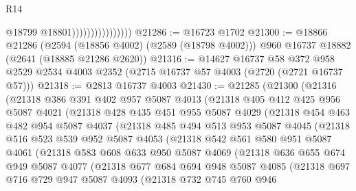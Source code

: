 \begin{lexlean}{R14}
\begin{coremodule}
                                    @18799
                                    @18801))))))))))))))))
@21286 := @16723 @1702
@21300 := @18866
    @21286
    (@2594 (@18856 @4002) (@2589 (@18798 @4002)))
    @960
    @16737
    @18882
    (@2641 (@18885 @21286 @2620))
@21316 := @14627
    @16737
    @58
    @372
    @958
    @2529
    @2534
    @4003
    @2352
    (@2715 @16737 @57 @4003 (@2720 (@2721 @16737 @57)))
@21318 := @2813 @16737 @4003
@21430 := @21285
    (@21300
      (@21316
        (@21318
          @386
          @391
          @402
          @957
          @5087
          @4013
          (@21318
            @405
            @412
            @425
            @956
            @5087
            @4021
            (@21318
              @428
              @435
              @451
              @955
              @5087
              @4029
              (@21318
                @454
                @463
                @482
                @954
                @5087
                @4037
                (@21318
                  @485
                  @494
                  @513
                  @953
                  @5087
                  @4045
                  (@21318
                    @516
                    @523
                    @539
                    @952
                    @5087
                    @4053
                    (@21318
                      @542
                      @561
                      @580
                      @951
                      @5087
                      @4061
                      (@21318
                        @583
                        @608
                        @633
                        @950
                        @5087
                        @4069
                        (@21318
                          @636
                          @655
                          @674
                          @949
                          @5087
                          @4077
                          (@21318
                            @677
                            @684
                            @694
                            @948
                            @5087
                            @4085
                            (@21318
                              @697
                              @716
                              @729
                              @947
                              @5087
                              @4093
                              (@21318
                                @732
                                @745
                                @760
                                @946

\end{coremodule}
\end{lexlean}
